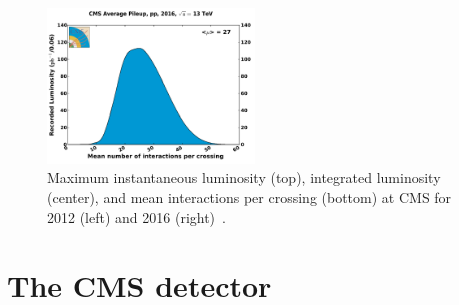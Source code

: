 \begin{figure}[!htb]
  \includegraphics[width=0.49\textwidth]{figures/pileup_pp_2016}
  \caption[Luminosity and average pileup at CMS]{
  Maximum instantaneous luminosity (top), integrated luminosity (center), and
  mean interactions per crossing (bottom) at CMS for 2012 (left) and 2016
  (right)~\cite{cmslumi}.
  }
  \label{fig:luminosity}
\end{figure}

\section{The CMS detector}
\label{sec:cms}

